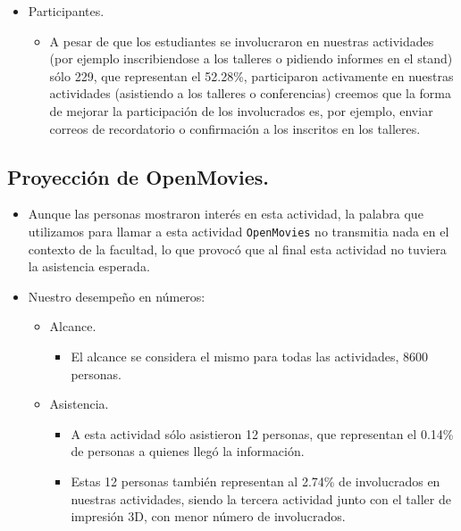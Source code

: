 \documentclass[a4paper,11pt]{article}                 %
\begin{document}
\begin{itemize}
\begin{itemize}
    \item Participantes.
    \begin{itemize}
      \item A pesar de que los estudiantes se involucraron en nuestras actividades (por ejemplo inscribiendose a los talleres o pidiendo informes en el stand) sólo 229, que representan el 52.28\%, participaron activamente en nuestras actividades (asistiendo a los talleres o conferencias) creemos que la forma de mejorar la participación de los involucrados es, por ejemplo, enviar correos de recordatorio o confirmación a los inscritos en los talleres. 
    \end{itemize}
    \end{itemize} 

  \end{itemize}
  
  \subsection{Proyección de OpenMovies.} 
  
  \begin{itemize}
    \item Aunque las personas mostraron interés en esta actividad, la palabra que utilizamos para llamar a esta actividad \texttt{OpenMovies} no transmitia nada en el contexto de la facultad, lo que provocó que al final esta actividad no tuviera la asistencia esperada.
    
    \item Nuestro desempeño en números:
    
    \begin{itemize}
    \item Alcance.
    \begin{itemize}
      \item El alcance se considera el mismo para todas las actividades, 8600 personas.
    \end{itemize}

    \item Asistencia.
    \begin{itemize}
      \item A esta actividad sólo asistieron 12 personas, que representan el 0.14\% de personas a quienes llegó la información.
      \item Estas 12 personas también representan al 2.74\% de involucrados en nuestras actividades, siendo la tercera actividad junto con el taller de impresión 3D, con menor número de involucrados. 
    \end{itemize}
    \end{itemize} 
    
  \end{itemize}
  
\end{document}

